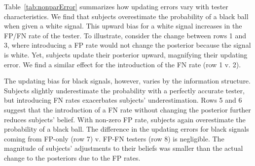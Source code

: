 \documentclass[12pt,a4paper]{article}
\begin{document}
\begin{table}[H]\centering 
\caption{Average Updating Error by Signal Type} 
\label{tab:nonparError}
\end{table}



Table~\ref{tab:nonparError} summarizes how updating errors vary with tester characteristics. We find that subjects overestimate the probability of a black ball when given a white signal. This upward bias for a white signal increases in the FP/FN rate of the tester. To illustrate, consider the change between rows 1 and 3, where introducing a FP rate would not change the posterior because the signal is white. Yet, subjects update their posterior upward, magnifying their updating error. We find a similar effect for the introduction of the FN rate (row 1 v. 2).

The updating bias for black signals, however, varies by the information structure. Subjects slightly underestimate the probability with a perfectly accurate tester, but introducing FN rates exacerbates subjects' underestimation. Rows 5 and 6 suggest that the introduction of a FN rate without changing the posterior further reduces subjects' belief. With non-zero FP rate, subjects again overestimate the probability of a black ball. The difference in the updating errors for black signals coming from FP-only (row 7) v. FP-FN testers (row 8) is negligible. 
The magnitude of subjects' adjustments to their beliefs was smaller than the actual change to the posteriors due to the FP rates.
\end{document}
